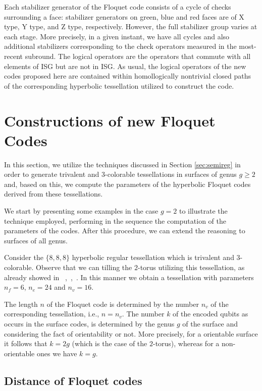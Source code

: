 \documentclass[%
reprint,
amsmath,amssymb,
aps,
]{revtex4-2}
\begin{document}
Each stabilizer generator of the Floquet code consists of a cycle of checks surrounding a face: stabilizer generators on green, blue and red faces are of X type, Y type, and Z type, respectively. However, the full stabilizer group varies at each stage. More precisely, in a given instant,  we have all cycles  and also additional stabilizers corresponding to the check operators measured in the most-recent subround. The logical operators are the operators that commute with all elements of ISG but are not in ISG. As usual, the logical operators of the new codes proposed here are contained within homollogically nontrivial closed paths of the corresponding hyperbolic tessellation utilized to construct the code.


\section{Constructions of new Floquet Codes}\label{NewFloquet}

In this section, we utilize the techniques discussed in Section \ref{sec:semireg} in order to generate trivalent and $3$-colorable tessellations in surfaces of genus $g\geq2$ and, based on this, we compute the parameters of the hyperbolic Floquet codes derived from these tessellations.

We start by presenting some examples in the case $g=2$ to illustrate the technique employed, performing in the sequence the computation of the parameters of the codes. After this procedure, we can extend the reasoning to surfaces of all genus.

Consider the $\{8,8,8\}$ hyperbolic regular tessellation which is trivalent and $3$-colorable. Observe that we can tilling the $2$-torus utilizing this tessellation, as already showed in  ~\cite{waldir2018},~\cite{albuquerque2009},~\cite{Breuckmann2016}. In this manner we obtain a tessellation with parameters $n_f =6$, $n_e=24$ and $n_v = 16$. 

The length  $n$ of the Floquet code is determined by the number $n_v$ of the corresponding tessellation, i.e., $n=n_v$. The number $k$ of the encoded qubits as occurs in the surface codes, is determined by the genus $g$ of the surface and considering the fact of orientability or not. More precisely, for a orientable surface it follows that $k=2g$ (which is the case of the $2$-torus), whereas for a non-orientable ones we have $k=g$.

\subsection{Distance of Floquet codes}
\end{document}
